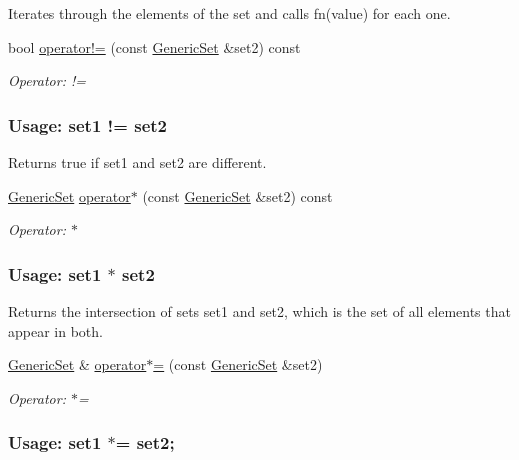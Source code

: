 \begin{DoxyCompactItemize}
\begin{DoxyCompactList}
Iterates through the elements of the set and calls {\ttfamily fn(value)} for each one. \end{DoxyCompactList}\item 
bool \mbox{\hyperlink{classstanfordcpplib_1_1collections_1_1GenericSet_a2da26ab6a8320bed56ef83210a0addf8}{operator!=}} (const \mbox{\hyperlink{classstanfordcpplib_1_1collections_1_1GenericSet}{Generic\+Set}} \&set2) const
\begin{DoxyCompactList}\small\item\em Operator\+: != \subsubsection*{Usage\+: set1 != set2 }

Returns {\ttfamily true} if {\ttfamily set1} and {\ttfamily set2} are different. \end{DoxyCompactList}\item 
\mbox{\hyperlink{classstanfordcpplib_1_1collections_1_1GenericSet}{Generic\+Set}} \mbox{\hyperlink{classstanfordcpplib_1_1collections_1_1GenericSet_a834d22cfc42c67b0243283c3bc02ce5e}{operator$\ast$}} (const \mbox{\hyperlink{classstanfordcpplib_1_1collections_1_1GenericSet}{Generic\+Set}} \&set2) const
\begin{DoxyCompactList}\small\item\em Operator\+: $\ast$ \subsubsection*{Usage\+: set1 $\ast$ set2 }

Returns the intersection of sets {\ttfamily set1} and {\ttfamily set2}, which is the set of all elements that appear in both. \end{DoxyCompactList}\item 
\mbox{\hyperlink{classstanfordcpplib_1_1collections_1_1GenericSet}{Generic\+Set}} \& \mbox{\hyperlink{classstanfordcpplib_1_1collections_1_1GenericSet_a1528986f737cd2163e1361e0bf326957}{operator$\ast$=}} (const \mbox{\hyperlink{classstanfordcpplib_1_1collections_1_1GenericSet}{Generic\+Set}} \&set2)
\begin{DoxyCompactList}\small\item\em Operator\+: $\ast$= \subsubsection*{Usage\+: set1 $\ast$= set2; }


\end{DoxyCompactList}
\end{DoxyCompactItemize}
